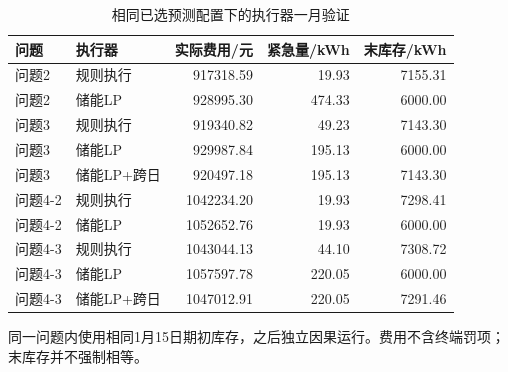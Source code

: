 \begin{table}[htbp]\centering\small
\caption{相同已选预测配置下的执行器一月验证}
\label{tab:v2_controller_validation}
\begin{tabularx}{\linewidth}{LLRRR}\toprule
问题 & 执行器 & 实际费用/元 & 紧急量/kWh & 末库存/kWh\\\midrule
问题2 & 规则执行 & 917318.59 & 19.93 & 7155.31\\
问题2 & 储能LP & 928995.30 & 474.33 & 6000.00\\
问题3 & 规则执行 & 919340.82 & 49.23 & 7143.30\\
问题3 & 储能LP & 929987.84 & 195.13 & 6000.00\\
问题3 & 储能LP+跨日 & 920497.18 & 195.13 & 7143.30\\
问题4-2 & 规则执行 & 1042234.20 & 19.93 & 7298.41\\
问题4-2 & 储能LP & 1052652.76 & 19.93 & 6000.00\\
问题4-3 & 规则执行 & 1043044.13 & 44.10 & 7308.72\\
问题4-3 & 储能LP & 1057597.78 & 220.05 & 6000.00\\
问题4-3 & 储能LP+跨日 & 1047012.91 & 220.05 & 7291.46\\
\bottomrule\end{tabularx}
\par\smallskip\parbox{\linewidth}{\footnotesize 同一问题内使用相同1月15日期初库存，之后独立因果运行。费用不含终端罚项；末库存并不强制相等。}
\end{table}